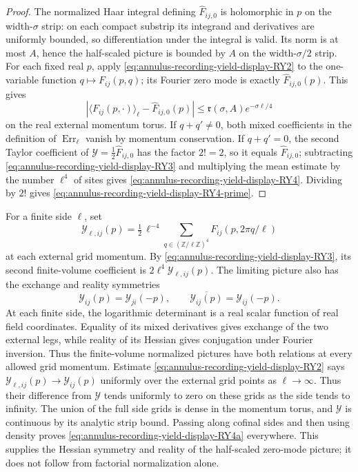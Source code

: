 \begin{proof}
The normalized Haar integral defining $\widehat F_{ij,0}$ is holomorphic
in $p$ on the width-$\sigma$ strip: on each compact substrip its integrand
and derivatives are uniformly bounded, so differentiation under the
integral is valid. Its norm is at most $A$, hence the half-scaled picture
is bounded by $A$ on the width-$\sigma/2$ strip. For each fixed real $p$,
apply \eqref{eq:annulus-recording-yield-display-RY2} to the one-variable function $q\mapsto F_{ij}(p,q)$; its
Fourier zero mode is exactly $\widehat F_{ij,0}(p)$. This gives
\[
 |\langle F_{ij}(p,\cdot)\rangle_\ell
              -\widehat F_{ij,0}(p)|
       \leq \mathfrak r(\sigma,A)e^{-\sigma\ell/4}
\]
on the real external momentum torus. If $q+q'\ne0$, both mixed
coefficients in the definition of $\operatorname{Err}_\ell$ vanish by
momentum conservation. If $q+q'=0$, the second Taylor coefficient of
$\mathcal Y=\frac12\widehat F_{ij,0}$ has the factor $2!=2$, so it equals
$\widehat F_{ij,0}$; subtracting \eqref{eq:annulus-recording-yield-display-RY3} and multiplying the mean estimate
by the number $\ell^4$ of sites gives \eqref{eq:annulus-recording-yield-display-RY4}. Dividing by $2!$ gives
\eqref{eq:annulus-recording-yield-display-RY4-prime}.
\end{proof}

For a finite side $\ell$, set
\[
 \mathcal Y_{\ell,ij}(p)=\tfrac12\,\ell^{-4}
        \sum_{q\in(\mathbb Z/\ell\mathbb Z)^4}F_{ij}(p,2\pi q/\ell)
\]
at each external grid momentum. By \eqref{eq:annulus-recording-yield-display-RY3}, its second
finite-volume coefficient is $2\ell^4\mathcal Y_{\ell,ij}(p)$.
The limiting picture also has the exchange and reality symmetries
\begin{equation}
 \mathcal Y_{ij}(p)=\mathcal Y_{ji}(-p),\qquad
 \overline{\mathcal Y_{ij}(p)}=\mathcal Y_{ij}(-p).
\label{eq:annulus-recording-yield-display-RY4a}
\end{equation}
At each finite side, the logarithmic determinant is a real scalar
function of real field coordinates. Equality of its mixed derivatives
gives exchange of the two external legs, while reality of its Hessian
gives conjugation under Fourier inversion. Thus the finite-volume
normalized pictures have both relations at every allowed grid momentum.
Estimate \eqref{eq:annulus-recording-yield-display-RY2} says $\mathcal Y_{\ell,ij}(p)\to\mathcal Y_{ij}(p)$
uniformly over the external grid points as $\ell\to\infty$. Thus their
difference from $\mathcal Y$ tends uniformly to zero on
these grids as the side tends to infinity. The union of the full side
grids is dense in the momentum torus, and $\mathcal Y$ is continuous by
its analytic strip bound. Passing along cofinal sides and then using
density proves \eqref{eq:annulus-recording-yield-display-RY4a} everywhere. This supplies the Hessian symmetry and
reality of the half-scaled zero-mode picture; it does not follow from
factorial normalization alone.

